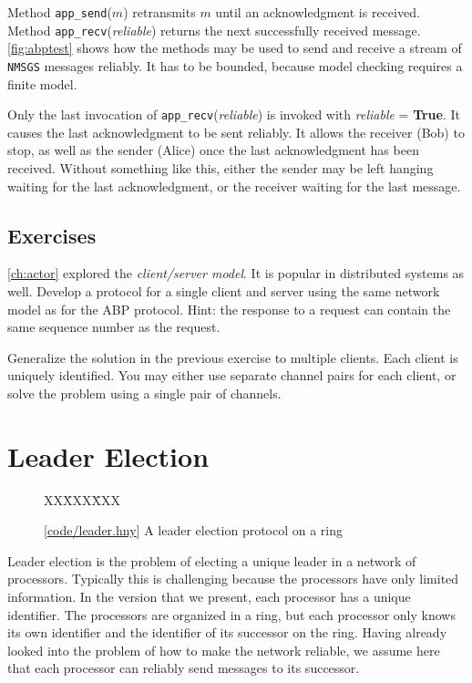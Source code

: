 \documentclass{report}
\newcommand{\harmonysource}[1]{
\begin{tabbing}
XX\=XXX\=XXX\kill
    
\end{tabbing}
}
\newcommand{\harmonylink}[1]{%
[\href{https://harmony.cs.cornell.edu/#1}{\underline{#1}}]%
}
\newenvironment{code}{
\tcolorbox
}{
\endtcolorbox
}
\begin{document}
Method \texttt{app\_send}($m$) retransmits $m$ until
an acknowledgment is received.
Method \texttt{app\_recv}(\textit{reliable}) returns the next successfully received
message.
\autoref{fig:abptest} shows how the methods may be used to send and receive
a stream of \texttt{NMSGS} messages reliably.
It has to be bounded, because model checking requires a finite model.

Only the last invocation of \texttt{app\_recv}(\textit{reliable}) is invoked with
\textit{reliable} = \textbf{True}.  It causes the last acknowledgment to be sent
reliably.  It allows the receiver (Bob) to stop, as well as the sender (Alice)
once the last acknowledgment has been received.
Without something like this, either the sender may be left hanging waiting
for the last acknowledgment, or the receiver waiting for the last message.

\section*{Exercises}
\begin{problems}
\item \autoref{ch:actor} explored the \emph{client/server model}.  It is popular
in distributed systems as well.
Develop a protocol for a single client and server using the same network
model as for the ABP protocol.
Hint: the response to a request can contain the same sequence number as the
request.
\item Generalize the solution in the previous exercise to multiple clients.
Each client is uniquely identified.  You may either use separate channel pairs
for each client, or solve the problem using a single pair of channels.
\end{problems}

\chapter{Leader Election}
\label{ch:leader}

\begin{figure}
\begin{code}
\harmonysource{leader}
\end{code}
\caption{\harmonylink{code/leader.hny} A leader election protocol on a ring}
\label{fig:leader}
\end{figure}

Leader election is the problem of electing a unique leader in a
network of processors.  Typically this is challenging because the
processors have only limited information.  In the version that we
present, each processor has a unique identifier.  The processors
are organized in a ring, but each processor only knows its own
identifier and the identifier of its successor on the ring.  Having
already looked into the problem of how to make the network reliable,
we assume here that each processor can reliably send messages to
its successor.
\end{document}
